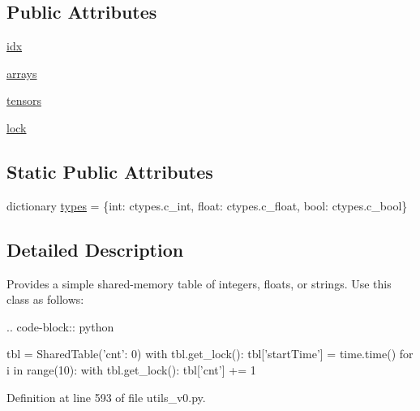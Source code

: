\subsection*{Public Attributes}
\begin{DoxyCompactItemize}
\item 
\hyperlink{classparlai_1_1agents_1_1legacy__agents_1_1seq2seq_1_1utils__v0_1_1SharedTable_ae28772f48b62430475ee87a0e0165297}{idx}
\item 
\hyperlink{classparlai_1_1agents_1_1legacy__agents_1_1seq2seq_1_1utils__v0_1_1SharedTable_a85e95ce5ffe060084b0aac12e09eb04d}{arrays}
\item 
\hyperlink{classparlai_1_1agents_1_1legacy__agents_1_1seq2seq_1_1utils__v0_1_1SharedTable_a10fd3cbec22c17f5e522d7813f3d3056}{tensors}
\item 
\hyperlink{classparlai_1_1agents_1_1legacy__agents_1_1seq2seq_1_1utils__v0_1_1SharedTable_acd92e05b572beb74c384c3c6b833dac6}{lock}
\end{DoxyCompactItemize}
\subsection*{Static Public Attributes}
\begin{DoxyCompactItemize}
\item 
dictionary \hyperlink{classparlai_1_1agents_1_1legacy__agents_1_1seq2seq_1_1utils__v0_1_1SharedTable_ac7e68f60287f180ffacb892540d737b8}{types} = \{int\+: ctypes.\+c\+\_\+int, float\+: ctypes.\+c\+\_\+float, bool\+: ctypes.\+c\+\_\+bool\}
\end{DoxyCompactItemize}


\subsection{Detailed Description}
\begin{DoxyVerb}Provides a simple shared-memory table of integers, floats, or strings. Use this
class as follows:

.. code-block:: python

    tbl = SharedTable({'cnt': 0})
    with tbl.get_lock():
        tbl['startTime'] = time.time()
    for i in range(10):
        with tbl.get_lock():
            tbl['cnt'] += 1
\end{DoxyVerb}
 

Definition at line 593 of file utils\+\_\+v0.\+py.



